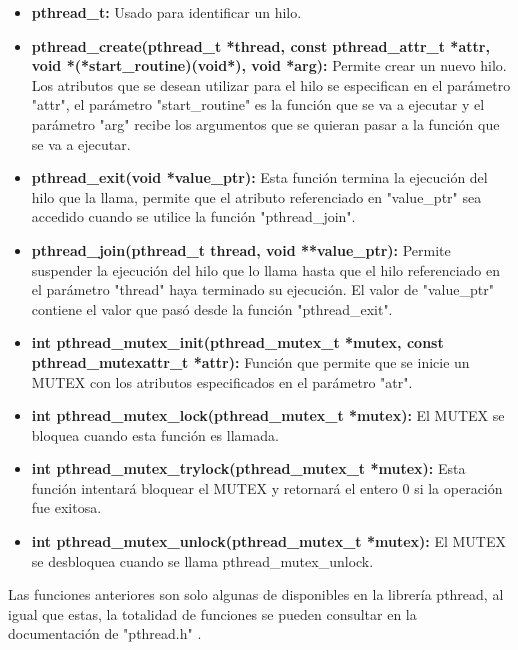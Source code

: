 \documentclass[16pt,a4papper]{article}
\begin{document}
	\begin{itemize}
		\item \textbf{pthread\_t:} Usado para identificar un hilo.
		\item \textbf{pthread\_create(pthread\_t *thread, const pthread\_attr\_t *attr,
			void *(*start\_routine)(void*), void *arg):} Permite crear un nuevo hilo. Los atributos que se desean utilizar para el hilo se especifican en el parámetro "attr", el parámetro "start\_routine" es la función que se va a ejecutar y el parámetro "arg" recibe los argumentos que se quieran pasar a la función que se va a ejecutar.
		\item \textbf{pthread\_exit(void *value\_ptr):} Esta función termina la ejecución del hilo que la llama, permite que el atributo referenciado en "value\_ptr" sea accedido cuando se utilice la función "pthread\_join".
		\item \textbf{pthread\_join(pthread\_t thread, void **value\_ptr):} Permite suspender la ejecución del hilo que lo llama hasta que el hilo referenciado en el parámetro "thread" haya terminado su ejecución. El valor de "value\_ptr" contiene el valor que pasó desde la función "pthread\_exit".
		\item \textbf{int pthread\_mutex\_init(pthread\_mutex\_t *mutex, const pthread\_mutexattr\_t *attr):} Función que permite que se inicie un MUTEX con los atributos especificados en el parámetro "atr".
		\item \textbf{int pthread\_mutex\_lock(pthread\_mutex\_t *mutex):} El MUTEX se bloquea cuando esta función es llamada.
		\item \textbf{int pthread\_mutex\_trylock(pthread\_mutex\_t *mutex):} Esta función intentará bloquear el MUTEX y retornará el entero 0 si la operación fue exitosa.
		\item \textbf{int pthread\_mutex\_unlock(pthread\_mutex\_t *mutex):} El MUTEX se desbloquea cuando se llama pthread\_mutex\_unlock.	
	\end{itemize}

	Las funciones anteriores son solo algunas de disponibles en la librería pthread, al igual que estas, la totalidad de funciones se pueden consultar en la documentación de "pthread.h" \cite{Pthread_documentation}. 

	
	
	\newpage
	\printbibliography
	
	
\end{document}
